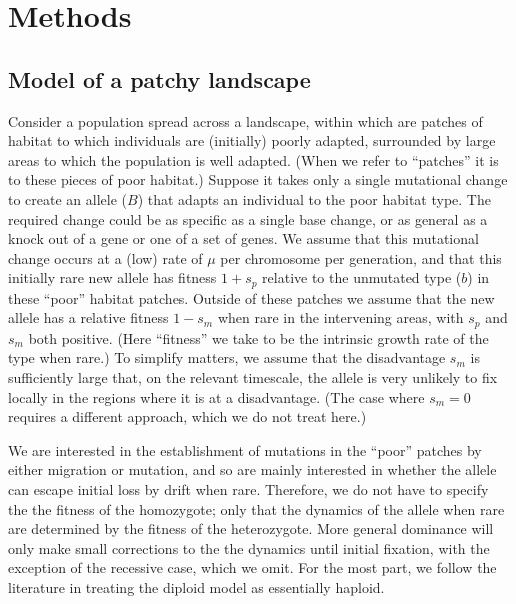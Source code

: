 \documentclass{article}
\begin{document}


\section{Methods}

\subsection{Model of a patchy landscape}
\label{ss:patchyspace}

Consider a population spread across a landscape, 
within which are patches of habitat to which individuals are (initially) poorly adapted,
surrounded by large areas to which the population is well adapted.
(When we refer to ``patches'' it is to these pieces of poor habitat.)
Suppose it takes only a single mutational change to create an allele
($B$) that adapts an individual to the poor habitat type.
The required change could be as specific as a single base change, 
or as general as a knock out of a gene or one of a set of genes.
We assume that this mutational change occurs at a (low) rate of $\mu$ per chromosome per generation,
and that this initially rare new allele has fitness $1+s_p$ relative to the unmutated type ($b$) in these ``poor'' habitat patches.
Outside of these patches we assume that the new allele has a relative fitness
$1-s_m$  when rare in the intervening areas, with $s_p$ and $s_m$ both positive.
(Here ``fitness'' we take to be the intrinsic growth rate of the type when rare.)
To simplify matters, we assume that the disadvantage $s_m$ 
is sufficiently large that, on the relevant timescale,
the allele is very unlikely to fix locally in the regions where it is at a disadvantage.
(The case where $s_m=0$ requires a different approach, which we do not treat here.)

We are interested in the establishment of mutations in the ``poor'' patches by either
migration or mutation, and so are mainly interested in whether the allele
can escape initial loss by drift when rare. 
Therefore, we do not have to specify the the fitness of the homozygote; 
only that the dynamics of the allele when rare 
are determined by the fitness of the heterozygote. 
More general dominance will only make small corrections to the the dynamics until initial fixation,
with the exception of the recessive case, which we omit.
For the most part, 
we follow the literature in treating the diploid model as essentially haploid.
\end{document}
